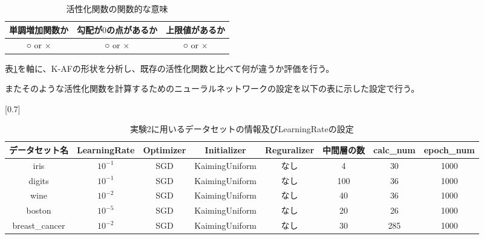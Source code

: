 \begin{table}[htbp]
    \begin{center}
        \caption{活性化関数の関数的な意味}
        \label{af-class}
        \vspace{2mm} 
        \begin{tabular}{ |c|c|c| }
        \hline
        単調増加関数か & 勾配が$ 0 $の点があるか & 上限値があるか   \\
        \hline
        ○ or × & ○ or × & ○ or ×  \\
        \hline
        \end{tabular}
    \end{center}
\end{table}


表\ref{af-class}を軸に、K-AFの形状を分析し、既存の活性化関数と比べて何が違うか評価を行う。

またそのような活性化関数を計算するためのニューラルネットワークの設定を以下の表に示した設定で行う。
\begin{table}[htbp]
    \begin{center}
        \caption{実験2に用いるデータセットの情報及びLearningRateの設定}
        \label{dataset_name2}
        \vspace{2mm} 

        \scalebox{0.7}[0.7]{
            \begin{tabular}{ |c|c|c|c|c|c|c|c| }
            \hline
            データセット名 & LearningRate & Optimizer & Initializer & Reguralizer & 中間層の数 & calc\_num & epoch\_num \\
            \hline
            iris           & $ 10^{-1} $    & SGD         & KaimingUniform        & なし      & 4 & 30 & 1000 \\
            \hline
            digits         & $ 10^{-1} $    & SGD         & KaimingUniform       & なし      & 100 & 36 & 1000 \\
            \hline
            wine           & $ 10^{-2} $    & SGD         & KaimingUniform       & なし      & 40 & 36 & 1000 \\
            \hline
            boston         & $ 10^{-5} $    & SGD        & KaimingUniform        & なし      & 20 & 26 & 1000 \\
            \hline
            breast\_cancer & $ 10^{-2} $    & SGD        & KaimingUniform        & なし      & 30 & 285 & 1000 \\
            \hline
            \end{tabular}
        }
    \end{center}
\end{table}

